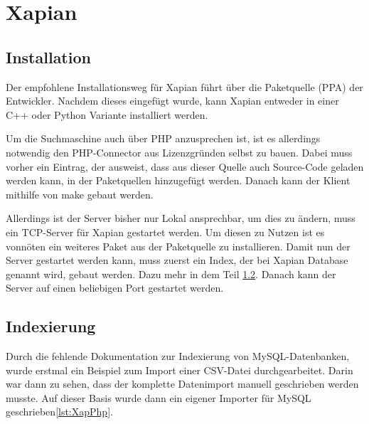 
\section{Xapian}

\subsection{Installation}

Der empfohlene Installationsweg für Xapian führt über die Paketquelle (PPA) der Entwickler. Nachdem dieses eingefügt wurde, kann Xapian entweder in einer C++ oder Python Variante installiert werden. 

Um die Suchmaschine auch über PHP anzusprechen ist, ist es allerdings notwendig den PHP-Connector aus Lizenzgründen selbst zu bauen. Dabei muss vorher ein Eintrag, der ausweist, dass aus dieser Quelle auch Source-Code geladen werden kann, in der Paketquellen hinzugefügt werden. Danach kann der Klient mithilfe von make gebaut werden.

Allerdings ist der Server bisher nur Lokal ansprechbar, um dies zu ändern, muss ein TCP-Server für Xapian gestartet werden. Um diesen zu Nutzen ist es vonnöten ein weiteres Paket aus der Paketquelle zu installieren. Damit nun der Server gestartet werden kann, muss zuerst ein Index, der bei Xapian Database genannt wird, gebaut werden. Dazu mehr in dem Teil \ref{xap:index}. Danach kann der Server auf einen beliebigen Port gestartet werden.

\subsection{Indexierung}
\label{xap:index}

Durch die fehlende Dokumentation zur Indexierung von MySQL-Datenbanken, wurde erstmal ein Beispiel zum Import einer CSV-Datei durchgearbeitet. Darin war dann zu sehen, dass der komplette Datenimport manuell geschrieben werden musste. Auf dieser Basis wurde dann ein eigener Importer für MySQL geschrieben\ref{lst:XapPhp}.


